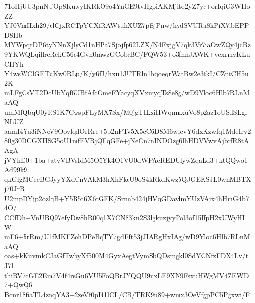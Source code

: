 71oHjUU3pnNTOp8KuwyIKRkO9o4YnGE9tvHgoiAKMjitq2yZ7yr+orIqiG3WHoZZ
YJ0VmHxh29/elCjxRCTpYCXfRAWtuhXUZ7pEjPnw/hydSVURn8kPiX7lbEPPD8Hb
MYWpqrDP6tyNNnXjlyCd1nHPa7Sjojfp62LZX/N4FxjgV7qk3Vr7iaOwZQy4jcBz
9YKWQLqillreRekC56c4Gvn0mwzGCobrBC/FQW53+o3fhnJAWK+vcxrmyKLuCHYh
Y4wsWClGETqKw0RLp/K/y6fJ/hxu1JUTRln1bqoeqrWatBw2e3tkI/CZntCH5u2K
mLFgCsVT2DoUbYqf6UBfAfcOmeFYacyqXVxmyqTs8e8g/wD9Yloc6Hlb7RLnMaAQ
umMfQbqU0yRS1K7CwspFLyMX7Sx/M0jgTILxiHWqmnxuVo8p2az1oUSdSLglNLUZ
aamI4Yu3iNNeV9OovlqdOrRre+5b2nPTv5X5cC6D8M6wIcvY6dxKzwfq1MdeIrv2
80g30DCGXIISG5oU1mfEVRjQFqGFe+jNeCn7nINDOzg6lhHDVVwvAjbrfR8tAAgA
jVYhD0+1ba+atvVBVsIdM5O5Yk4O1VU0dWPAeREDUlywZqaLd3+ktQQwo1Ad99k9
qkGlgMCeeBG3yyYXdCnVAkM3hXhFkeU9oS4kRkdKwz5QJGEKSJL0wnMBTXj70JrR
U2mpDYjp2ozlqB+Y5B5t6X6tGFK/Srnnb424jHVqGDaylmYUzVAix4hHmG4b74O/
CCfDh+VnUBQ97efyDw8hR00q1X7CN83kn2S3lgkuzjyyPol3of15IfpH2xUWyHIW
mF6+5rRm/U1fMKFZohDPeBqTY7gdEft53jJIARgHxIAg/wD9Yloc6Hlb7RLnMaAQ
oas+kKuvmkCJaGfTwbyXf500M4GyxAegtVymSbQDsmgkl0SdYCNfzFDX4Lv/tJ7l
thiRV7cGE2Em7V4f4rsGu6VU5FoQBrJYQQU9nxLE9XN9FsxuHWgMV4ZEWD7+QwQ6
Bcnr18fiaTL4znqYA3+2zeVf0pI41lCL/CB/TRK9u89+wmx3OeVfgpPC5Pgxwi/F
